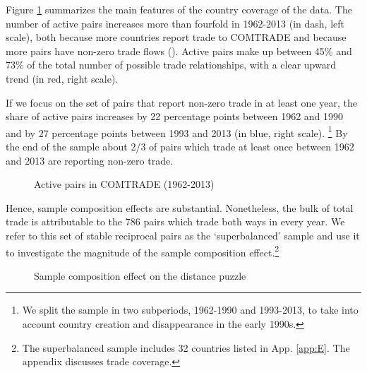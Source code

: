 \documentclass[12pt,twoside,a4paper,notitlepage]{article}
\begin{document}
Figure \ref{fig:active_pairs} summarizes the main features of the country coverage of the data.
The number of active pairs increases more than fourfold in 1962-2013 (in dash, left scale), both because more countries report trade to COMTRADE and because more pairs have non-zero trade flows (\cite{Helpman2008}).
Active pairs make up between 45\% and 73\% of the total number of possible trade relationships, with a clear upward trend (in red, right scale).

If we focus on the set of pairs that report non-zero trade in at least one year, the share of active pairs increases by 22 percentage points between 1962 and 1990 and by 27 percentage points between 1993 and 2013 (in blue, right scale).
\footnote{We split the sample in two subperiods, 1962-1990 and 1993-2013, to take into account country creation and disappearance in the early 1990s.}
By the end of the sample about 2/3 of pairs which trade at least once between 1962 and 2013 are reporting non-zero trade.

\begin{figure}[h!]
	\caption{Active pairs in COMTRADE (1962-2013) \label{fig:active_pairs}}
	\begin{center}
		\setlength{\fboxrule}{1pt} %
		\setlength{\fboxsep}{.1in} %
	\end{center}
\end{figure}

Hence, sample composition effects are substantial.
Nonetheless, the bulk of total trade is attributable to the 786 pairs which trade both ways in every year.
We refer to this set of stable reciprocal pairs as the `superbalanced' sample and use it to investigate the magnitude of the sample composition effect.\footnote{The superbalanced sample includes 32 countries listed in App. \ref{app:E}. The appendix discusses trade coverage.\label{fnsuperbalanced}}

\begin{figure}[h!]
	\caption{Sample composition effect on the distance puzzle\label{fig:compsample}}
	\begin{center}
		\setlength{\fboxrule}{1pt} %
		\setlength{\fboxsep}{.1in} %
	\end{center}
\end{figure}
\end{document}
